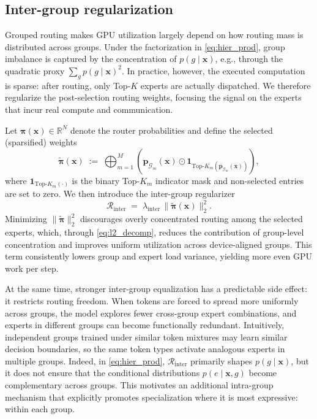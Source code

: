 \documentclass[sigconf,nonacm]{acmart}
\begin{document}
\subsection{Inter-group regularization}
Grouped routing makes GPU utilization largely depend on how routing mass is distributed across groups.
Under the factorization in \eqref{eq:hier_prod}, group imbalance is captured by the concentration of $p(g\mid \mathbf{x})$, e.g., through the quadratic proxy $\sum_g p(g\mid \mathbf{x})^2$.
In practice, however, the executed computation is sparse: after routing, only Top-$K$ experts are actually dispatched.
We therefore regularize the post-selection routing weights, focusing the signal on the experts that incur real compute and communication.

Let $\bm{\pi}(\mathbf{x}) \in \mathbb{R}^N$ denote the router probabilities and define the selected (sparsified) weights
\begin{equation}
\widetilde{\boldsymbol{\pi}}(\mathbf{x})
\;:=\;
\bigoplus_{m=1}^{M}
\left(
\mathbf{p}_{\mathcal{G}_m}(\mathbf{x})
\odot
\mathbf{1}_{\mathrm{Top}\text{-}K_m\!\left(\mathbf{p}_{\mathcal{G}_m}(\mathbf{x})\right)}
\right),
\label{eq:topk_pi}
\end{equation}
where $\mathbf{1}_{\mathrm{Top}\text{-}K_m(\cdot)}$ is the binary Top-$K_m$ indicator mask and non-selected entries are set to zero.
We then introduce the inter-group regularizer
\begin{equation}
\mathcal{R}_{\text{inter}}
\;=\;
\lambda_{\text{inter}} \,\bigl\|\widetilde{\bm{\pi}}(\mathbf{x})\bigr\|_2^2 .
\label{eq:r_inter}
\end{equation}
Minimizing $\|\widetilde{\bm{\pi}}\|_2^2$ discourages overly concentrated routing among the selected experts, which, through \eqref{eq:l2_decomp}, reduces the contribution of group-level concentration and improves uniform utilization across device-aligned groups.
This term consistently lowers group and expert load variance, yielding more even GPU work per step.

At the same time, stronger inter-group equalization has a predictable side effect: it restricts routing freedom.
When tokens are forced to spread more uniformly across groups, the model explores fewer cross-group expert combinations, and experts in different groups can become functionally redundant.
Intuitively, independent groups trained under similar token mixtures may learn similar decision boundaries, so the same token types activate analogous experts in multiple groups.
Indeed, in \eqref{eq:hier_prod}, $\mathcal{R}_{\text{inter}}$ primarily shapes $p(g\mid \mathbf{x})$, but it does not ensure that the conditional distributions $p(e\mid \mathbf{x}, g)$ become complementary across groups.
This motivates an additional intra-group mechanism that explicitly promotes specialization where it is most expressive: within each group.
\end{document}
